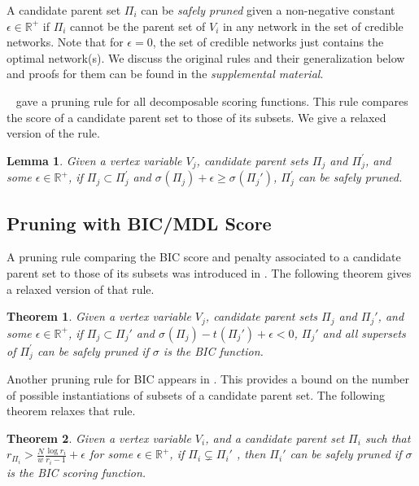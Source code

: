 \documentclass[letterpaper]{article}
\newcommand{\vertex}[1]{V_{#1}}
\newcommand{\parents}{\Pi}
\newcommand{\score}[2]{\sigma_{#1}({#2})}
\newcommand{\pen}[2]{t_{#1}({#2})}
\newtheorem{theorem}{Theorem}
\newtheorem{lemma}{Lemma}
\begin{document}
A candidate parent set $\Pi_i$ can be \textit{safely pruned} given a non-negative constant $\epsilon \in \mathbb{R}^+$ if $\Pi_i$ cannot be the parent set of $V_i$ in any network in the set of credible networks. Note that for $\epsilon=0$, the set of credible  networks just contains the optimal network(s). We discuss the original rules and their generalization below and proofs for them can be found in the \emph{supplemental material}.



\citeauthor{TeyssierK05}~ gave a pruning rule for all decomposable scoring functions. This rule compares the score of a candidate parent set to those of its subsets. We give a relaxed version of the rule.


\begin{lemma}
Given a vertex variable $\vertex{j}$, candidate parent sets
$\Pi_j$ and  $\Pi_j^{\prime}$, and some $\epsilon\in \mathbb{R}^+$,  if $\Pi_j \subset \Pi_j^{\prime}$ and $\score{}{\Pi_j} + \epsilon \geq \score{}{\Pi_j'}$,
$\Pi_j^{\prime}$ can be safely pruned. \label{lem:scoreprune}
\end{lemma}

\subsection{Pruning with BIC/MDL Score}


A pruning rule comparing the BIC score and penalty associated to a candidate parent set to those of its subsets was introduced in \cite{CamposJ11}. The following theorem gives a relaxed version of that rule.
\begin{theorem}
Given a vertex variable $\vertex{j}$,  candidate parent sets
$\Pi_j$ and $\Pi_j'$, and some $\epsilon \in \mathbb{R}^+$,
if $\Pi_j \subset \Pi_j'$ and $\score{}{\Pi_j} -  \pen{}{\Pi_j'} + \epsilon < 0$,
$\Pi_j'$ and all supersets of $\Pi_j^{\prime}$ can be safely pruned  if $\sigma$ is the BIC function.
\end{theorem}

Another pruning rule for BIC appears in \cite{CamposJ11}. This provides a bound on the number of possible instantiations of subsets of a candidate parent set. The following theorem relaxes that rule.




\begin{theorem}
Given a vertex variable $V_i$, and a candidate parent set $\Pi_i$ such that $r_{\Pi_i}> \frac{N}{w} \frac{\log r_i}{r_i -1} + \epsilon$ for some $\epsilon \in \mathbb{R}^+$,  if $\parents_i \subsetneq \parents_i'$ , then $\parents_i'$ can be safely pruned if $\sigma$ is the BIC scoring function. \label{THEOREM:decamposbicrelaxed}
\end{theorem}
\end{document}
